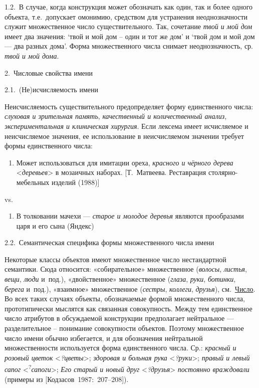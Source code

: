 1.2.~В случае, когда конструкция может обозначать как один, так и более
одного объекта, т.е.~допускает омонимию, средством для устранения
неоднозначности служит множественное число существительного. Так,
сочетание \textit{твой и мой дом} имеет два значения: `твой и мой дом --
один и тот же дом' и `твой дом и мой дом --- два разных дома'. Форма
множественного числа снимает неоднозначность, ср. \textit{твой и мой
  дома}.

2.~Числовые свойства имени

2.1.~(Не)исчисляемость имени

Неисчисляемость существительного предопределяет форму единственного
числа: \textit{слуховая и зрительная память}, \textit{качественный и
  количественный анализ}, \textit{экспериментальная и клиническая хирургия}.
Если лексема имеет исчисляемое и неисчисляемое значения, ее
использование в неисчисляемом значении требует формы единственного
числа:

\begin{enumerate}
  \def\labelenumi{(\arabic{enumi})}
  \setcounter{enumi}{143}
  \item
        Может использоваться для имитации ореха, \textit{красного и чёрного
          дерева} \textless*\textit{деревьев}\textgreater{} в мозаичных наборах.
        {[}Т.~Матвеева. Реставрация столярно-мебельных изделий (1988){]}
\end{enumerate}

vs.

\begin{enumerate}
  \def\labelenumi{(\arabic{enumi})}
  \setcounter{enumi}{144}
  \item
        В толковании мачехи --- \textit{старое и молодое деревья} являются
        прообразами царя и его сына (Яндекс)
\end{enumerate}

2.2.~Семантическая специфика формы множественного числа имени

Некоторые классы объектов имеют множественное число нестандартной
семантики. Сюда относится: «собирательное» множественное (\textit{волосы},
\textit{листья}, \textit{вещи}, \textit{люди} и~под.), «двойственное»
множественное (\textit{глаза}, \textit{руки}, \textit{ботинки}, \textit{берега}
и~под.), «взаимное» множественное (\textit{сестры}, \textit{коллеги},
\textit{друзья}), см.~\underline{Число}. Во всех таких случаях объекты,
обозначаемые формой множественного числа, прототипически мыслятся как
связанная совокупность. Между тем единственное число атрибутов в
обсуждаемой конструкции предполагает нейтральное --- разделительное --
понимание совокупности объектов. Поэтому множественное число имени
обычно избегается, и для обозначения нейтральной множественности
используется форма единственного числа. Ср.: \textit{красный и розовый
  цветок} \textless{}\textit{?цветы}\textgreater; \textit{здоровая и больная
  рука} \textless{}\textit{?руки}\textgreater; \textit{правый и левый сапог}
\textless{}\textsuperscript{?}\textit{сапоги}\textgreater; \textit{Его
  старый и новый друг} \textless{}\textit{?друзья}\textgreater{}
\textit{постоянно враждовали} (примеры из {[}Кодзасов~1987:~207--208{]}).

